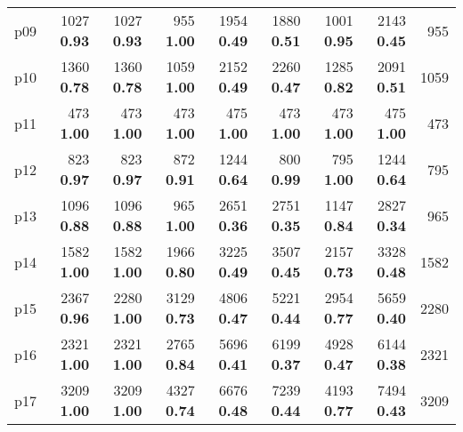 \begin{tabular}{|l|rrrrrrr|r|}
p09 & {\footnotesize 1027} \textbf{0.93} & {\footnotesize 1027} \textbf{0.93} & {\footnotesize 955} \textbf{1.00} & {\footnotesize 1954} \textbf{0.49} & {\footnotesize 1880} \textbf{0.51} & {\footnotesize 1001} \textbf{0.95} & {\footnotesize 2143} \textbf{0.45} & 955\\
p10 & {\footnotesize 1360} \textbf{0.78} & {\footnotesize 1360} \textbf{0.78} & {\footnotesize 1059} \textbf{1.00} & {\footnotesize 2152} \textbf{0.49} & {\footnotesize 2260} \textbf{0.47} & {\footnotesize 1285} \textbf{0.82} & {\footnotesize 2091} \textbf{0.51} & 1059\\
p11 & {\footnotesize 473} \textbf{1.00} & {\footnotesize 473} \textbf{1.00} & {\footnotesize 473} \textbf{1.00} & {\footnotesize 475} \textbf{1.00} & {\footnotesize 473} \textbf{1.00} & {\footnotesize 473} \textbf{1.00} & {\footnotesize 475} \textbf{1.00} & 473\\
p12 & {\footnotesize 823} \textbf{0.97} & {\footnotesize 823} \textbf{0.97} & {\footnotesize 872} \textbf{0.91} & {\footnotesize 1244} \textbf{0.64} & {\footnotesize 800} \textbf{0.99} & {\footnotesize 795} \textbf{1.00} & {\footnotesize 1244} \textbf{0.64} & 795\\
p13 & {\footnotesize 1096} \textbf{0.88} & {\footnotesize 1096} \textbf{0.88} & {\footnotesize 965} \textbf{1.00} & {\footnotesize 2651} \textbf{0.36} & {\footnotesize 2751} \textbf{0.35} & {\footnotesize 1147} \textbf{0.84} & {\footnotesize 2827} \textbf{0.34} & 965\\
p14 & {\footnotesize 1582} \textbf{1.00} & {\footnotesize 1582} \textbf{1.00} & {\footnotesize 1966} \textbf{0.80} & {\footnotesize 3225} \textbf{0.49} & {\footnotesize 3507} \textbf{0.45} & {\footnotesize 2157} \textbf{0.73} & {\footnotesize 3328} \textbf{0.48} & 1582\\
p15 & {\footnotesize 2367} \textbf{0.96} & {\footnotesize 2280} \textbf{1.00} & {\footnotesize 3129} \textbf{0.73} & {\footnotesize 4806} \textbf{0.47} & {\footnotesize 5221} \textbf{0.44} & {\footnotesize 2954} \textbf{0.77} & {\footnotesize 5659} \textbf{0.40} & 2280\\
p16 & {\footnotesize 2321} \textbf{1.00} & {\footnotesize 2321} \textbf{1.00} & {\footnotesize 2765} \textbf{0.84} & {\footnotesize 5696} \textbf{0.41} & {\footnotesize 6199} \textbf{0.37} & {\footnotesize 4928} \textbf{0.47} & {\footnotesize 6144} \textbf{0.38} & 2321\\
p17 & {\footnotesize 3209} \textbf{1.00} & {\footnotesize 3209} \textbf{1.00} & {\footnotesize 4327} \textbf{0.74} & {\footnotesize 6676} \textbf{0.48} & {\footnotesize 7239} \textbf{0.44} & {\footnotesize 4193} \textbf{0.77} & {\footnotesize 7494} \textbf{0.43} & 3209\\

\end{tabular}
